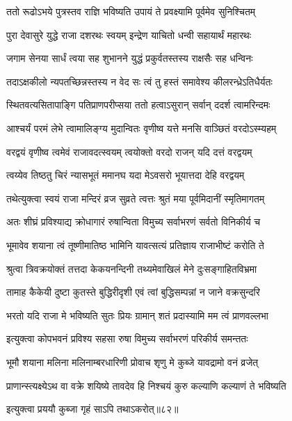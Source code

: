 \twolineshloka
{ततो रूढोऽभये पुत्रस्तव राज्ञि भविष्यति}
{उपायं ते प्रवक्ष्यामि पूर्वमेव सुनिश्चितम्} %

\twolineshloka
{पुरा देवासुरे युद्धे राजा दशरथः स्वयम्}
{इन्द्रेण याचितो धन्वी सहायार्थं महारथः} %

\twolineshloka
{जगाम सेनया सार्धं त्वया सह शुभानने}
{युद्धं प्रकुर्वतस्तस्य राक्षसैः सह धन्विनः} %

\twolineshloka
{तदाऽक्षकीलो न्यपतच्छिन्नस्तस्य न वेद सः}
{त्वं तु हस्तं समावेश्य कीलरन्ध्रेऽतिधैर्यतः} %

\twolineshloka
{स्थितवत्यसितापाङ्गि पतिप्राणपरीप्सया}
{ततो हत्वाऽसुरान् सर्वान् ददर्श त्वामरिन्दमः} %

\twolineshloka
{आश्चर्यं परमं लेभे त्वामालिङ्ग्य मुदान्वितः}
{वृणीष्व यत्ते मनसि वाञ्छितं वरदोऽस्म्यहम्} %

\twolineshloka
{वरद्वयं वृणीष्व त्वमेवं राजावदत्स्वयम्}
{त्वयोक्तो वरदो राजन् यदि दत्तं वरद्वयम्} %

\twolineshloka
{त्वय्येव तिष्ठतु चिरं न्यासभूतं ममानघ}
{यदा मेऽवसरो भूयात्तदा देहि वरद्वयम्} %

\twolineshloka
{तथेत्युक्त्वा स्वयं राजा मन्दिरं व्रज सुव्रते}
{त्वत्तः श्रुतं मया पूर्वमिदानीं स्मृतिमागतम्} %

\twolineshloka
{अतः शीघ्रं प्रविश्याद्य क्रोधागारं रुषान्विता}
{विमुच्य सर्वाभरणं सर्वतो विनिकीर्य च} %

\twolineshloka
{भूमावेव शयाना त्वं तूष्णीमातिष्ठ भामिनि}
{यावत्सत्यं प्रतिज्ञाय राजाभीष्टं करोति ते} %

\twolineshloka
{श्रुत्वा त्रिवक्रयोक्तं तत्तदा केकयनन्दिनी}
{तथ्यमेवाखिलं मेने दुःसङ्गाहितविभ्रमा} %

\twolineshloka
{तामाह कैकेयी दुष्टा कुतस्ते बुद्धिरीदृशी}
{एवं त्वां बुद्धिसम्पन्नां न जाने वक्रसुन्दरि} %

\twolineshloka
{भरतो यदि राजा मे भविष्यति सुतः प्रियः}
{ग्रामान् शतं प्रदास्यामि मम त्वं प्राणवल्लभा} %

\twolineshloka
{इत्युक्त्वा कोपभवनं प्रविश्य सहसा रुषा}
{विमुच्य सर्वाभरणं परिकीर्य समन्ततः} %

\twolineshloka
{भूमौ शयाना मलिना मलिनाम्बरधारिणी}
{प्रोवाच शृणु मे कुब्जे यावद्रामो वनं व्रजेत्} %

\twolineshloka
{प्राणान्स्त्यक्ष्येऽथ वा वक्रे शयिष्ये तावदेव हि}
{निश्चयं कुरु कल्याणि कल्याणं ते भविष्यति} %

{इत्युक्त्वा प्रययौ कुब्जा गृहं साऽपि तथाऽकरोत्॥८२॥} %


